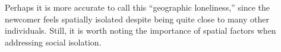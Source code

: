Perhaps it is more accurate to call this ``geographic loneliness,'' since the newcomer feels spatially isolated despite being quite close to many other individuals. Still, it is worth noting the importance of  spatial factors when addressing social isolation.



